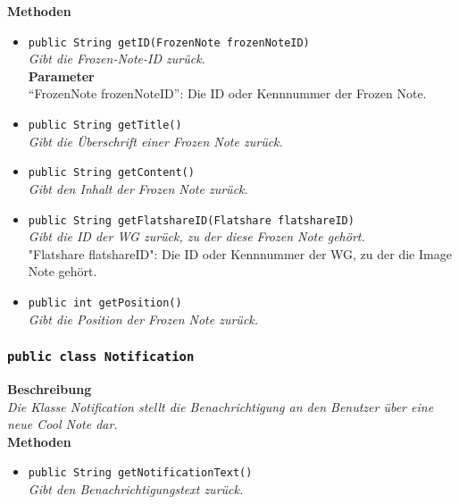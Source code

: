 	\textbf{Methoden}
	\begin{itemize}
		\item\texttt{{public String getID(FrozenNote frozenNoteID)}}\\
		\textit{Gibt die Frozen-Note-ID zurück.}\\
		\textbf{Parameter}\\
		“FrozenNote frozenNoteID”: Die ID oder Kennnummer der Frozen Note.\\
		
		\item\texttt{{public String getTitle()}}\\
		\textit{Gibt die Überschrift einer Frozen Note zurück.}\\
		
		\item\texttt{{public String getContent()}}\\
		\textit{Gibt den Inhalt der Frozen Note zurück.}\\
		
		\item\texttt{{public String getFlatshareID(Flatshare flatshareID)}}\\
		\textit{Gibt die ID der WG zurück, zu der diese Frozen Note gehört.}\\
		"Flatshare flatshareID": Die ID oder Kennnummer der WG, zu der die Image Note gehört.
		
		\item\texttt{{public int getPosition()}}\\
		\textit{Gibt die Position der Frozen Note zurück.}\\
	\end{itemize}

\subsubsection{\texttt{public class Notification}}

	\textbf{Beschreibung} \\
	\textit{Die Klasse Notification stellt die Benachrichtigung an den Benutzer über eine neue Cool Note dar.} \\
	
	\textbf{Methoden}
	\begin{itemize}
		\item\texttt{{public String getNotificationText()}}\\
		\textit{Gibt den Benachrichtigungstext zurück.}\\
	\end{itemize}

